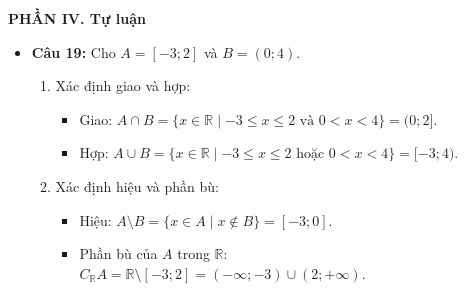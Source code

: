 \documentclass[12pt,a4paper]{article}
\begin{document}
\vspace{0.15cm}
\textbf{PHẦN IV. Tự luận}
\begin{itemize}[leftmargin=0.6cm, itemsep=3pt]
    \item \textbf{Câu 19:} Cho $A = [-3; 2]$ và $B = (0; 4)$.
    \begin{enumerate}[label=\alph*)]
        \item Xác định giao và hợp:
        \begin{itemize}
            \item Giao: $A \cap B = \{x \in \mathbb{R} \mid -3 \le x \le 2 \text{ và } 0 < x < 4\} = (0; 2]$.
            \item Hợp: $A \cup B = \{x \in \mathbb{R} \mid -3 \le x \le 2 \text{ hoặc } 0 < x < 4\} = [-3; 4)$.
        \end{itemize}
        \item Xác định hiệu và phần bù:
        \begin{itemize}
            \item Hiệu: $A \setminus B = \{x \in A \mid x \notin B\} = [-3; 0]$.
            \item Phần bù của $A$ trong $\mathbb{R}$: $C_{\mathbb{R}} A = \mathbb{R} \setminus [-3; 2] = (-\infty; -3) \cup (2; +\infty)$.
        \end{itemize}
    \end{enumerate}


\end{itemize}
\end{document}
